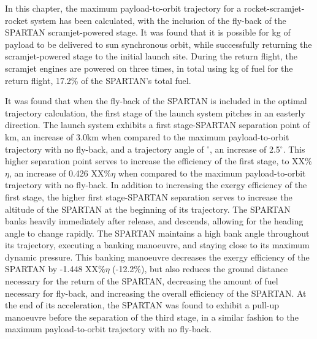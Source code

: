 In this chapter, the maximum payload-to-orbit trajectory for a rocket-scramjet-rocket system has been calculated, with the inclusion of the fly-back of the SPARTAN scramjet-powered stage. It was found that it is possible for \PayloadToOrbitStandard kg of payload to be delivered to sun synchronous orbit, while successfully returning the scramjet-powered stage to the initial launch site. 
During the return flight, the scramjet engines are powered on three times, in total using \returnFuelStandard kg of fuel for the return flight, 17.2\% of the SPARTAN's total fuel.

It was found that when the fly-back of the SPARTAN is included in the optimal trajectory calculation, the first stage of the launch system pitches in an easterly direction. 
The launch system exhibits a first stage-SPARTAN separation point of \firstsecondSeparationAltStandard km, an increase of 3.0km when compared to the maximum payload-to-orbit trajectory with no fly-back, and a trajectory angle of \firstsecondSeparationgammaStandard $^\circ$, an increase of 2.5$^\circ$. 
This higher separation point serves to increase the efficiency of the first stage, to \firstExergyEffStandard  XX\%$\eta$, an increase of 0.426 XX\%$\eta$ when compared to the maximum payload-to-orbit trajectory with no fly-back.
In addition to increasing the exergy efficiency of the first stage, the higher first stage-SPARTAN separation serves to increase the altitude of the SPARTAN at the beginning of its trajectory. The SPARTAN banks heavily immediately after release, and descends, allowing for the heading angle to change rapidly. The SPARTAN maintains a high bank angle throughout its trajectory, executing a banking manoeuvre, and staying close to its maximum dynamic pressure. 
This banking manoeuvre decreases the exergy efficiency of the SPARTAN by -1.448 XX\%$\eta$ (-12.2\%), but also reduces the ground distance necessary for the return of the SPARTAN, decreasing the amount of fuel necessary for fly-back, and increasing the overall efficiency of the SPARTAN. 
At the end of its acceleration, the SPARTAN was found to exhibit a pull-up manoeuvre before the separation of the third stage, in a similar fashion to the maximum payload-to-orbit trajectory with no fly-back. 

